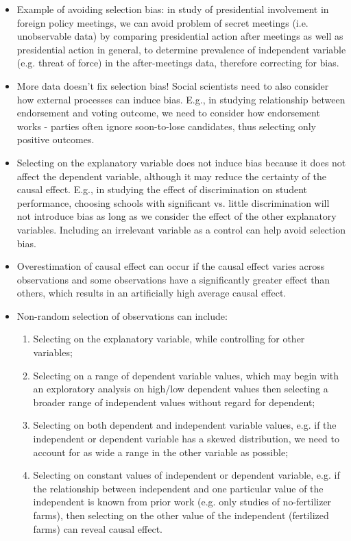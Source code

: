 \documentclass[11pt,letterpaper]{article}
\begin{document}
\begin{itemize}
\item Example of avoiding selection bias: in study of presidential involvement in foreign policy meetings, we can avoid problem of secret meetings (i.e. unobservable data) by comparing presidential action after meetings as well as presidential action in general, to determine prevalence of independent variable (e.g. threat of force) in the after-meetings data, therefore correcting for bias. 
\item More data doesn't fix selection bias! Social scientists need to also consider how external processes can induce bias. E.g., in studying relationship between endorsement and voting outcome, we need to consider how endorsement works - parties often ignore soon-to-lose candidates, thus selecting only positive outcomes. 
\item Selecting on the explanatory variable does not induce bias because it does not affect the dependent variable, although it may reduce the certainty of the causal effect. E.g., in studying the effect of discrimination on student performance, choosing schools with significant vs. little discrimination will not introduce bias as long as we consider the effect of the other explanatory variables. Including an irrelevant variable as a control can help avoid selection bias.
\item Overestimation of causal effect can occur if the causal effect varies across observations and some observations have a significantly greater effect than others, which results in an artificially high average causal effect. 
\item Non-random selection of observations can include:
\begin{enumerate}
\item Selecting on the explanatory variable, while controlling for other variables; 
\item Selecting on a range of dependent variable values, which may begin with an exploratory analysis on high/low dependent values then selecting a broader range of independent values without regard for dependent; 
\item Selecting on both dependent and independent variable values, e.g. if the independent or dependent variable has a skewed distribution, we need to account for as wide a range in the other variable as possible;
\item Selecting on constant values of independent or dependent variable, e.g. if the relationship between independent and one particular value of the independent is known from prior work (e.g. only studies of no-fertilizer farms), then selecting on the other value of the independent (fertilized farms) can reveal causal effect.
\end{enumerate}
\end{itemize}
\end{document}
